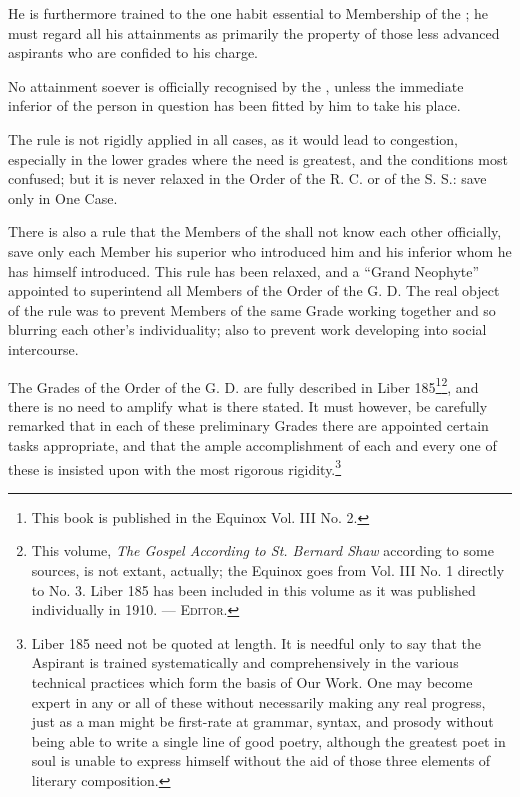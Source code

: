 He is furthermore trained to the one habit essential to Membership of the \Argentium{}; he must regard all his attainments as primarily the property of those less advanced aspirants who are confided to his charge.

No attainment soever is officially recognised by the \Argentium{}, unless the immediate inferior of the person in question has been fitted by him to take his place.

The rule is not rigidly applied in all cases, as it would lead to congestion, especially in the lower grades where the need is greatest, and the conditions most confused; but it is never relaxed in the Order of the R. C. or of the S. S.: save only in One Case.

There is also a rule that the Members of the \Argentium{} shall not know each other officially, save only each Member his superior who introduced him and his inferior whom he has himself introduced. This rule has been relaxed, and a \enquote{Grand Neophyte} appointed to superintend all Members of the Order of the G. D. The real object of the rule was to prevent Members of the same Grade working together and so blurring each other's individuality; also to prevent work developing into social intercourse.

The Grades of the Order of the G. D. are fully described in Liber 185\footnote{This book is published in the Equinox Vol. III No. 2.\footnotemark}\footnote{This volume, \textit{The Gospel According to St. Bernard Shaw} according to some sources, is not extant, actually; the Equinox goes from Vol. III No. 1 directly to No. 3. Liber 185 has been included in this volume as it was published individually in 1910. --- \textsc{Editor.}}, and there is no need to amplify what is there stated. It must however, be carefully remarked that in each of these preliminary Grades there are appointed certain tasks appropriate, and that the ample accomplishment of each and every one of these is insisted upon with the most rigorous rigidity.\footnote{Liber 185 need not be quoted at length. It is needful only to say that the Aspirant is trained systematically and comprehensively in the various technical practices which form the basis of Our Work. One may become expert in any or all of these without necessarily making any real progress, just as a man might be first-rate at grammar, syntax, and prosody without being able to write a single line of good poetry, although the greatest poet in soul is unable to express himself without the aid of those three elements of literary composition.}

